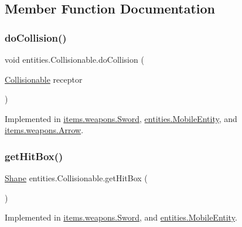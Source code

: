 \subsection{Member Function Documentation}
\mbox{\label{interfaceentities_1_1_collisionable_aaebba0fda34be003cfe326471e1418c8}} 
\subsubsection{\texorpdfstring{do\+Collision()}{doCollision()}}
{\footnotesize\ttfamily void entities.\+Collisionable.\+do\+Collision (\begin{DoxyParamCaption}\item[{\mbox{\hyperlink{interfaceentities_1_1_collisionable}{Collisionable}}}]{receptor }\end{DoxyParamCaption})}



Implemented in \mbox{\hyperlink{classitems_1_1weapons_1_1_sword_a3b4292b936e2d5e5aad2b1f0b2c2f935}{items.\+weapons.\+Sword}}, \mbox{\hyperlink{classentities_1_1_mobile_entity_af199b48458492a960d53a5a7c7685552}{entities.\+Mobile\+Entity}}, and \mbox{\hyperlink{classitems_1_1weapons_1_1_arrow_aab7e6b254eafcc351c445269351900c0}{items.\+weapons.\+Arrow}}.

\mbox{\label{interfaceentities_1_1_collisionable_a850ae5aa594d7b0d29ccef98436b8e77}} 
\subsubsection{\texorpdfstring{get\+Hit\+Box()}{getHitBox()}}
{\footnotesize\ttfamily \mbox{\hyperlink{classorg_1_1newdawn_1_1slick_1_1geom_1_1_shape}{Shape}} entities.\+Collisionable.\+get\+Hit\+Box (\begin{DoxyParamCaption}{ }\end{DoxyParamCaption})}



Implemented in \mbox{\hyperlink{classitems_1_1weapons_1_1_sword_ab34faa345e31beb308cf3fbc3383aebf}{items.\+weapons.\+Sword}}, and \mbox{\hyperlink{classentities_1_1_mobile_entity_a7192f025dc20283c5eee9efb9d5b4b6f}{entities.\+Mobile\+Entity}}.

